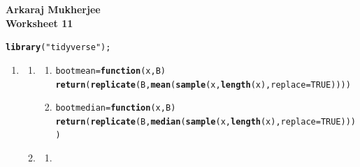 \documentclass[12pt,english]{article}\usepackage[]{graphicx}\usepackage[]{xcolor}
\makeatletter
\newcommand{\hlnum}[1]{\textcolor[rgb]{0.686,0.059,0.569}{#1}}%
\newcommand{\hlsng}[1]{\textcolor[rgb]{0.192,0.494,0.8}{#1}}%
\newcommand{\hldef}[1]{\textcolor[rgb]{0.345,0.345,0.345}{#1}}%
\newcommand{\hlkwa}[1]{\textcolor[rgb]{0.161,0.373,0.58}{\textbf{#1}}}%
\newcommand{\hlkwb}[1]{\textcolor[rgb]{0.69,0.353,0.396}{#1}}%
\newcommand{\hlkwc}[1]{\textcolor[rgb]{0.333,0.667,0.333}{#1}}%
\newcommand{\hlkwd}[1]{\textcolor[rgb]{0.737,0.353,0.396}{\textbf{#1}}}%
\newenvironment{kframe}{%
 \def\at@end@of@kframe{}%
 \ifinner\ifhmode%
  \def\at@end@of@kframe{\end{minipage}}%
  \begin{minipage}{\columnwidth}%
 \fi\fi%
 \def\FrameCommand##1{\hskip\@totalleftmargin \hskip-\fboxsep
 \colorbox{shadecolor}{##1}\hskip-\fboxsep
     \hskip-\linewidth \hskip-\@totalleftmargin \hskip\columnwidth}%
 \MakeFramed {\advance\hsize-\width
   \@totalleftmargin\z@ \linewidth\hsize
   \@setminipage}}%
 {\par\unskip\endMakeFramed%
 \at@end@of@kframe}
\newenvironment{knitrout}{}{} %
\makeatother
\begin{document}
\textbf{Arkaraj Mukherjee} \\ \textbf{Worksheet 11}
\begin{knitrout}
\color{fgcolor}\begin{kframe}
\begin{alltt}
\hlkwd{library}\hldef{(}\hlsng{"tidyverse"}\hldef{);}
\end{alltt}
\end{kframe}
\end{knitrout}
\begin{enumerate}[label=\arabic*.]
	\item \begin{enumerate}[label=(\alph*)]
			\item \begin{enumerate}[label=(\alph*)]
					\item 
\begin{knitrout}
\color{fgcolor}\begin{kframe}
\begin{alltt}
\hldef{bootmean} \hlkwb{=} \hlkwa{function}\hldef{(}\hlkwc{x}\hldef{,}\hlkwc{B}\hldef{)}
        \hlkwd{return}\hldef{(}\hlkwd{replicate}\hldef{(B,}\hlkwd{mean}\hldef{(}\hlkwd{sample}\hldef{(x,}\hlkwd{length}\hldef{(x),}\hlkwc{replace}\hldef{=}\hlnum{TRUE}\hldef{))))}
\end{alltt}
\end{kframe}
\end{knitrout}
					\item
\begin{knitrout}
\color{fgcolor}\begin{kframe}
\begin{alltt}
\hldef{bootmedian} \hlkwb{=} \hlkwa{function}\hldef{(}\hlkwc{x}\hldef{,}\hlkwc{B}\hldef{)}
        \hlkwd{return}\hldef{(}\hlkwd{replicate}\hldef{(B,}\hlkwd{median}\hldef{(}\hlkwd{sample}\hldef{(x,}\hlkwd{length}\hldef{(x),}\hlkwc{replace}\hldef{=}\hlnum{TRUE}\hldef{))))}
\end{alltt}
\end{kframe}
\end{knitrout}
			\end{enumerate}
			\item \begin{enumerate}[label=(\alph*)]
			    	\item
\begin{knitrout}
\color{fgcolor}\begin{kframe}

\end{kframe}
\end{knitrout}
\end{enumerate}
\end{enumerate}
\end{enumerate}
\end{document}

